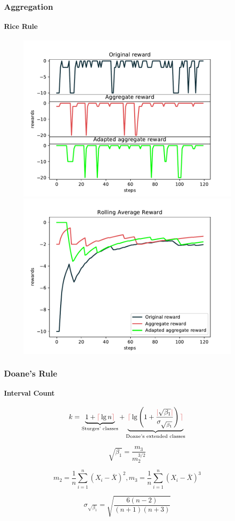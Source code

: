\documentclass[mathserif]{beamer}
\begin{document}
    \begin{frame}
        \frametitle{Aggregation}
        \framesubtitle{Rice Rule}

        \begin{figure}
            \label{fig:rice-rewards}
            \centering
            \includegraphics[width=0.46\columnwidth]{res/experiments/rice_steps_rewards.pdf}
            \qquad
            \includegraphics[width=0.46\columnwidth]{res/experiments/rice_rolling_rewards.pdf}
        \end{figure}

    \end{frame}


    \begin{frame}
        \frametitle{Doane's Rule}
        \framesubtitle{Interval Count}

        \[
            k = \underbrace{1 + \textcolor{maraschino}{\lceil} \lg n\textcolor{maraschino}{\rceil}}_{\text{Sturges' classes}} + \underbrace{ \textcolor{maraschino}{\lceil} \lg \left(1 +
            \frac{\textcolor{maraschino}{|}\sqrt{\beta_{1}}\textcolor{maraschino}{|}}
            {\sigma_{\sqrt{\beta_{1}}}}\right)\textcolor{maraschino}{\rceil}}_{\text{Doane's extended classes}}
        \]


        \begin{equation}
            \label{eq:fisher_pearson_coefficient}
            \sqrt{\beta_{1}} = \frac{m_{3}}{m_{2}^{3/2}}
        \end{equation}

        \begin{equation}
            \label{eq:pearson_moments}
            m_{2} = \frac{1}{n} \sum_{i=1}^{n}\left(X_{i}-\bar{X}\right)^{2} ,
            m_{3}=\frac{1}{n} \sum_{i=1}^{n}\left(X_{i}-\bar{X}\right)^{3}
        \end{equation}

        \begin{equation}
            \label{eq:pearson_estimated}
            \sigma_{\sqrt{\beta_{1}}} = \sqrt{\frac{6(n-2)}{(n+1)(n+3)}}
        \end{equation}
    \end{frame}
\end{document}
